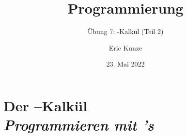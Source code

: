\documentclass{beamer}
\begin{document}
	
	\title{Programmierung}
	\subtitle{Übung 7: \textlambda-Kalkül (Teil 2)}
	\author{Eric Kunze}
	\date{23. Mai 2022}
	
	\maketitle
	




\section{Der \textlambda--Kalkül \\ \normalsize \itshape Programmieren mit \textlambda's}
\end{document}
